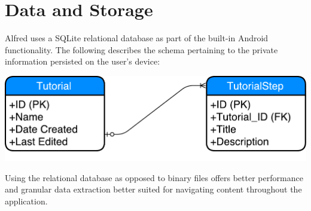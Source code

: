 \documentclass[12pt]{article}
\begin{document}
\section{Data and Storage}

Alfred uses a SQLite relational database as part of the built-in Android functionality. The following describes the schema pertaining to the private information persisted on the user's device:

\begin{center}
\includegraphics[scale=0.5]{images/schema.pdf}
\end{center}

Using the relational database as opposed to binary files offers better performance and granular data extraction better suited for navigating content throughout the application.
\end{document}
